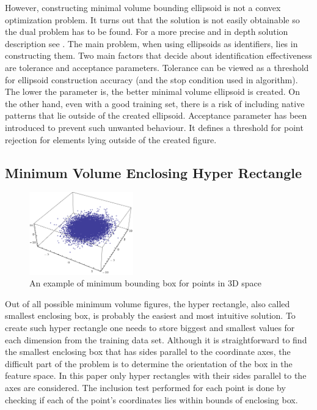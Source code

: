 However, constructing minimal volume bounding ellipsoid is not a convex optimization problem. It turns out that the solution is not easily obtainable so the dual problem has to be found. For a more precise and in depth solution description see \cite{MVEEMichaelTodd2005}. The main problem, when using ellipsoids as identifiers, lies in constructing them. Two main factors that decide about identification effectiveness are tolerance and acceptance parameters. Tolerance can be viewed as a threshold for ellipsoid construction accuracy (and the stop condition used in algorithm). The lower the parameter is, the better minimal volume ellipsoid is created. On the other hand, even with a good training set, there is a risk of including native patterns that lie outside of the created ellipsoid. Acceptance parameter has been introduced to prevent such unwanted behaviour. It defines a threshold for point rejection for elements lying outside of the created figure.

\subsection{Minimum Volume Enclosing Hyper Rectangle}

\begin{figure}[htp]
	\centering
	\includegraphics[width=0.40\textwidth]{Figures/minimum_bounding_box.png}
	\caption{An example of minimum bounding box for points in 3D space}
	\label{fig:minimum_bounding_box_visualization}\vspace{-3pt}
\end{figure}

Out of all possible minimum volume figures, the hyper rectangle, also called smallest enclosing box, is probably the easiest and most intuitive solution. To create such hyper rectangle one needs to store biggest and smallest values for each dimension from the training data set. Although it is straightforward to find the smallest enclosing box that has sides parallel to the coordinate axes, the difficult part of the problem is to determine the orientation of the box in the feature space. In this paper only hyper rectangles with their sides parallel to the axes are considered. The inclusion test performed for each point is done by checking if each of the point's coordinates lies within bounds of enclosing box.